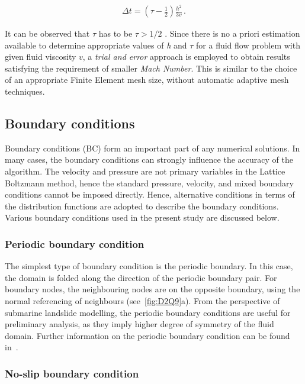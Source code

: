 \begin{align}
	\Delta \mathit{t} = (\tau - \frac{1}{2}) \frac{h^{2}}{3\mathit{v}}\,.
\end{align}

It can be observed that $\tau$ has to be $\tau > 1/2$ \citep{He1997}. Since 
there is no a priori estimation available to determine appropriate values of 
\textit{h} and $\tau$ for a fluid flow problem with given fluid viscosity 
$\mathit{v}$, a \textit{trial and error} approach is employed to obtain results 
satisfying the requirement of smaller \textit{Mach Number}. This is similar to 
the choice of an appropriate Finite Element mesh size, without automatic 
adaptive mesh techniques. 


\subsection{Boundary conditions}

Boundary conditions (BC) form an important part of any numerical solutions. In 
many cases, the boundary conditions can strongly influence the accuracy of the 
algorithm. The velocity and pressure are not primary variables in the Lattice 
Boltzmann method, hence the standard pressure, velocity, and mixed boundary 
conditions cannot be imposed directly. Hence, alternative conditions in terms 
of the distribution functions are adopted to describe the boundary conditions. 
Various boundary conditions used in the present study are discussed below.

\subsubsection*{Periodic boundary condition}

The simplest type of boundary condition is the periodic boundary. In this case, 
the domain is folded along the direction of the periodic boundary pair. For 
boundary nodes, the neighbouring nodes are on the opposite boundary, using the 
normal referencing of neighbours (see~\cref{fig:D2Q9}a). From the perspective 
of submarine landslide modelling, the periodic boundary conditions are useful 
for preliminary analysis, as they imply higher degree of symmetry of the fluid 
domain. Further information on the periodic boundary condition can be found 
in~\citet{Aidun1998}.

\subsubsection*{No-slip boundary condition} \label{bounce}

